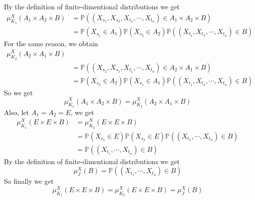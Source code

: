 \documentclass{ctexart}
\begin{document}
\begin{solution}
	By the definition of finite-dimentional distributions we get
	\[
		\begin{aligned}
			\mu^X_{K_1}(A_1 \times A_2 \times B) & =\mathbb{P}((X_{s_1},X_{s_2},X_{t_1},\cdots,X_{t_n}) \in A_1 \times A_2 \times B)                         \\
			                                     & =\mathbb{P}(X_{s_1} \in A_1)\mathbb{P}(X_{s_2} \in A_2)\mathbb{P}((X_{t_1},X_{t_2},\cdots,X_{t_n}) \in B)
		\end{aligned}
	\]
	For the same reason, we obtain
	\[
		\begin{aligned}
			\mu^X_{K_2}(A_2 \times A_1 \times B)                                                                         \\
			 & =\mathbb{P}((X_{s_2},X_{s_1},X_{t_1},\cdots,X_{t_n}) \in A_2 \times A_1 \times B)                         \\
			 & =\mathbb{P}(X_{s_2} \in A_2)\mathbb{P}(X_{s_1} \in A_1)\mathbb{P}((X_{t_1},X_{t_2},\cdots,X_{t_n}) \in B)
		\end{aligned}
	\]
	So we get
	\[
		\mu^X_{K_1}(A_1 \times A_2 \times B)=\mu^X_{K_2}(A_2 \times A_1 \times B)
	\]
	Also, let \(A_1=A_2=E\), we get
	\[
		\begin{aligned}
			\mu^X_{K_1}(E \times E \times B) & =\mu^X_{K_2}(E \times E \times B)                                                             \\
			                                 & =\mathbb{P}(X_{s_1} \in E)\mathbb{P}(X_{s_2} \in E)\mathbb{P}((X_{t_1},\cdots,X_{t_n}) \in B) \\
			                                 & =\mathbb{P}((X_{t_1},\cdots,X_{t_n}) \in B)
		\end{aligned}
	\]
	By the definition of finite-dimentional distributions we get
	\[
		\mu^X_{J}(B)=\mathbb{P}((X_{t_1},\cdots,X_{t_n}) \in B)
	\]
	So finally we get
	\[
		\mu^X_{K_1}(E \times E \times B)=\mu^X_{K_2}(E \times E \times B)=\mu^X_{J}(B)
	\]
\end{solution}
\end{document}
